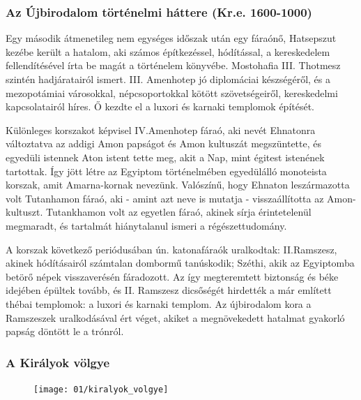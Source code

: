 \subsubsection*{Az Újbirodalom történelmi háttere (Kr.e. 1600-1000)}

Egy második átmenetileg nem egységes időszak után egy fáraónő, Hatsepszut kezébe került a hatalom, aki számos építkezéssel, hódítással, a kereskedelem fellendítésével írta be magát a történelem könyvébe. Mostohafia III. Thotmesz szintén hadjáratairól ismert. III. Amenhotep jó diplomáciai készségéről, és a mezopotámiai városokkal, népcsoportokkal kötött szövetségeiről, kereskedelmi kapcsolatairól híres. Ő kezdte el a luxori és karnaki templomok építését.

Különleges korszakot képvisel IV.Amenhotep fáraó, aki nevét Ehnatonra változtatva az addigi Amon papságot és Amon kultuszát megszüntette, és egyedüli istennek Aton istent tette meg, akit a Nap, mint égitest istenének tartottak. Így jött létre az Egyiptom történelmében egyedülálló monoteista korszak, amit Amarna-kornak nevezünk. Valószínű, hogy Ehnaton leszármazotta volt Tutanhamon fáraó, aki - amint azt neve is mutatja - visszaállította az Amon-kultuszt. Tutankhamon volt az egyetlen fáraó, akinek sírja érintetelenül megmaradt, és tartalmát hiánytalanul ismeri a régészettudomány.

A korszak következő periódusában ún. katonafáraók uralkodtak: II.Ramszesz, akinek hódításairól számtalan dombormű tanúskodik; Széthi, akik az Egyiptomba betörő népek visszaverésén fáradozott. Az így megteremtett biztonság és béke idejében épültek tovább, és II. Ramszesz dicsőségét hirdették a már említett thébai templomok: a luxori és karnaki templom. Az újbirodalom kora a Ramszeszek uralkodásával ért véget, akiket a megnövekedett hatalmat gyakorló papság döntött le a trónról.

\subsubsection*{A Királyok völgye}

\begin{figure}
	\begin{tcolorbox}[enhanced,colframe=gray!50!white,
		colbacktitle=white!15!white,
		coltitle=gray!50!black,
		borderline={0.5mm}{0mm}{gray!15!white},
		borderline={0.5mm}{0mm}{gray!50!white,dashed},
		attach boxed title to top center={yshift=-2mm},
		boxed title style={boxrule=0.4pt},
		title=Királyok völgye]{
			\texttt{[image: 01/kiralyok\_volgye]}}
	\end{tcolorbox}
\end{figure}

